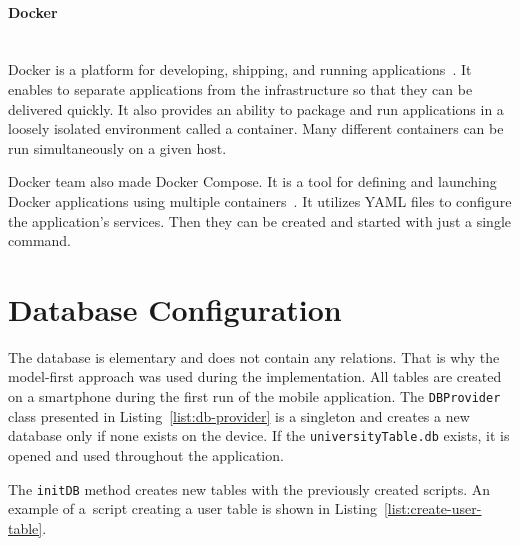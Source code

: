 \paragraph{\large{Docker}}\mbox{}\\[2pt]
Docker is a platform for developing, shipping, and running applications~\cite{docker}. It enables to separate applications from the infrastructure so that they can be delivered quickly. It also provides an ability to package and run applications in a loosely isolated environment called a container. Many different containers can be run simultaneously on a given host.

Docker team also made Docker Compose. It is a tool for defining and launching Docker applications using multiple containers~\cite{docker-compose}. It utilizes YAML files to configure the application’s services. Then they can be created and started with just a single command.

\section{Database Configuration}
The database is elementary and does not contain any relations. That is why the model-first approach was used during the implementation. All tables are created on a smartphone during the first run of the mobile application. The \texttt{DBProvider} class presented in Listing~\ref{list:db-provider} is a singleton and creates a new database only if none exists on the device. If the \texttt{universityTable.db} exists, it is opened and used throughout the application.



 The \texttt{initDB} method creates new tables with the previously created scripts. An example of a~script creating a user table is shown in Listing~\ref{list:create-user-table}.




